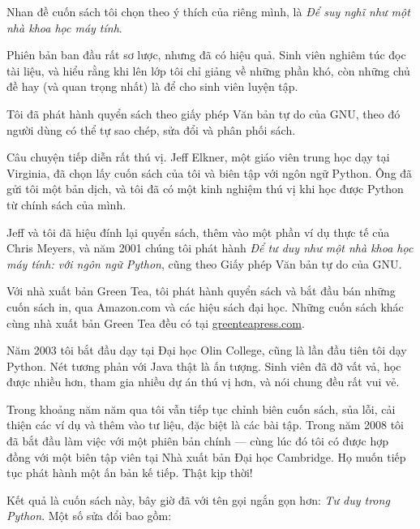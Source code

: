 \documentclass[11pt]{book}
\begin{document}
Nhan đề cuốn sách tôi chọn theo ý thích của riêng mình, là {\em Để suy nghĩ 
như một nhà khoa học máy tính}.

Phiên bản ban đầu rất sơ lược, nhưng đã có hiệu quả. Sinh viên nghiêm túc
đọc tài liệu, và hiểu rằng khi lên lớp tôi chỉ giảng về những phần khó, còn
những chủ đề hay (và quan trọng nhất) là để cho sinh viên luyện tập.

Tôi đã phát hành quyển sách theo giấy phép Văn bản tự do của GNU,
theo đó người dùng có thể tự sao chép, sửa đổi và phân phối sách.


Câu chuyện tiếp diễn rất thú vị. Jeff Elkner, một giáo viên trung học
dạy tại Virginia, đã chọn lấy cuốn sách của tôi và biên tập với ngôn ngữ
Python. Ông đã gửi tôi một bản dịch, và tôi đã có một kinh nghiệm
thú vị khi học được Python từ chính sách của mình.

Jeff và tôi đã hiệu đính lại quyển sách, thêm vào một phần ví dụ thực tế
của Chris Meyers, và năm 2001 chúng tôi phát hành {\em Để tư duy như
một nhà khoa học máy tính: với ngôn ngữ Python}, cũng theo 
Giấy phép Văn bản tự do của GNU.

Với nhà xuất bản Green Tea, tôi phát hành quyển sách và bắt đầu bán
những cuốn sách in, qua Amazon.com và các hiệu sách đại học.
Những cuốn sách khác cùng nhà xuất bản Green Tea đều có tại
\url{greenteapress.com}.

Năm 2003 tôi bắt đầu dạy tại Đại học Olin College, cũng là lần đầu tiên tôi dạy
Python. Nét tương phản với Java thật là ấn tượng. Sinh viên đã đỡ vất vả,
học được nhiều hơn, tham gia nhiều dự án thú vị hơn, và nói chung đều 
rất vui vẻ.

Trong khoảng năm năm qua tôi vẫn tiếp tục chỉnh biên cuốn sách, 
sủa lỗi, cải thiện các ví dụ và thêm vào tư liệu, đặc biệt là các bài tập.
Trong năm 2008 tôi đã bắt đầu làm việc với một phiên bản chính --- 
cùng lúc đó tôi có được hợp đồng với một biên tập viên tại
Nhà xuất bản Đại học Cambridge. Họ muốn tiếp tục phát hành
một ấn bản kế tiếp. Thật kịp thời!

Kết quả là cuốn sách này, bây giờ đã với tên gọi ngắn gọn hơn:
{\em Tư duy trong Python}.  Một số sửa đổi bao gồm:
\end{document}
